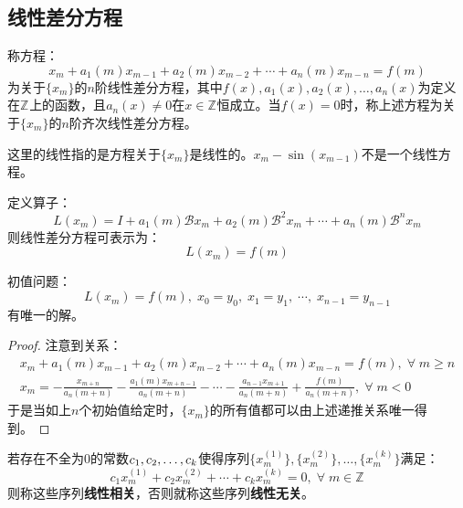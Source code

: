 \subsection{线性差分方程}
\begin{definition}
	称方程：
	\begin{equation*}
		x_m+a_1(m)x_{m-1}+a_2(m)x_{m-2}+\cdots+a_n(m)x_{m-n}=f(m)
	\end{equation*}
	为关于$\{x_m\}$的$n$阶线性差分方程，其中$f(x),a_1(x),a_2(x),\dots,a_n(x)$为定义在$\mathbb{Z}^{}$上的函数，且$a_n(x)\ne0$在$x\in\mathbb{Z}^{}$恒成立。当$f(x)=0$时，称上述方程为关于$\{x_m\}$的$n$阶齐次线性差分方程。
\end{definition}
\begin{note}
	这里的线性指的是方程关于$\{x_m\}$是线性的。$x_m-\sin(x_{m-1})$不是一个线性方程。
\end{note}
\begin{derivation}
	定义算子：
	\begin{equation*}
		L(x_m)=I+a_1(m)\mathcal{B}x_m+a_2(m)\mathcal{B}^2x_m+\cdots+a_n(m)\mathcal{B}^nx_m
	\end{equation*}
	则线性差分方程可表示为：
	\begin{equation*}
		L(x_m)=f(m)
	\end{equation*}
\end{derivation}
\begin{theorem}\label{theo:LinearDifferenceEqExistenceUniqueness}
	初值问题：
	\begin{equation*}
		L(x_m)=f(m),\;x_0=y_0,\;x_1=y_1,\;\cdots,\;x_{n-1}=y_{n-1}
	\end{equation*}
	有唯一的解。
\end{theorem}
\begin{proof}
	注意到关系：
	\begin{gather*}
		x_m+a_1(m)x_{m-1}+a_2(m)x_{m-2}+\cdots+a_n(m)x_{m-n}=f(m),\;\forall\;m\geqslant n \\
		x_{m}=-\frac{x_{m+n}}{a_n(m+n)}-\frac{a_1(m)x_{m+n-1}}{a_n(m+n)}-\cdots-\frac{a_{n-1}x_{m+1}}{a_n(m+n)}+\frac{f(m)}{a_n(m+n)},\;\forall\;m<0
	\end{gather*}
	于是当如上$n$个初始值给定时，$\{x_m\}$的所有值都可以由上述递推关系唯一得到。
\end{proof}
\begin{definition}
	若存在不全为$0$的常数$c_1, c_2, \dots, c_{k}$使得序列$\{x_m^{(1)}\},\{x_m^{(2)}\},\dots,\{x_m^{(k)}\}$满足：
	\begin{equation*}
		c_1x_m^{(1)}+c_2x_m^{(2)}+\cdots+c_kx_m^{(k)}=0,\;\forall\;m\in\mathbb{Z}^{}
	\end{equation*}
	则称这些序列\textbf{线性相关}，否则就称这些序列\textbf{线性无关}。
\end{definition}

